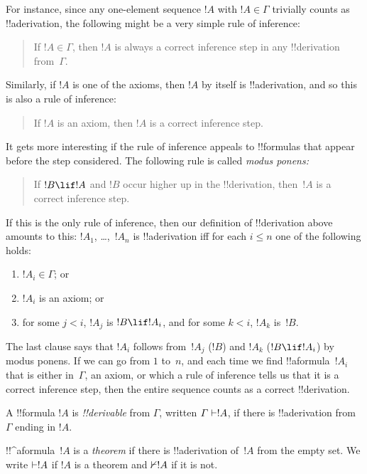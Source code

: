 \documentclass[../../../include/open-logic-section]{subfiles}
\begin{document}
For instance, since any one-element sequence $!A$ with $!A \in \Gamma$
trivially counts as !!a{derivation}, the following might be a very
simple rule of inference:
\begin{quote}
  If $!A \in \Gamma$, then $!A$ is always a correct inference step in
  any !!{derivation} from~$\Gamma$.
\end{quote}
Similarly, if $!A$ is one of the axioms, then $!A$ by itself is
!!a{derivation}, and so this is also a rule of inference:
\begin{quote}
  If $!A$ is an axiom, then $!A$ is a correct inference step.
\end{quote}
It gets more interesting if the rule of inference appeals to
!!{formula}s that appear before the step considered. The following
rule is called \emph{modus ponens:}
\begin{quote}
  If $!B \lif !A$ and $!B$ occur higher up in the !!{derivation},
  then~$!A$ is a correct inference step.
\end{quote}
If this is the only rule of inference, then our definition of
!!{derivation} above amounts to this: $!A_1$, \dots,~$!A_n$ is
!!a{derivation} iff for each $i \le n$ one of the following holds:
\begin{enumerate}
\item $!A_i \in \Gamma$; or
\item $!A_i$ is an axiom; or
\item for some $j < i$, $!A_j$ is $!B \lif !A_i$, and for some $k < i$,
  $!A_k$ is~$!B$.
\end{enumerate}
The last clause says that $!A_i$ follows from~$!A_j$ ($!B$) and $!A_k$
($!B \lif !A_i$) by modus ponens. If we can go from $1$ to~$n$, and
each time we find !!a{formula}~$!A_i$ that is either in~$\Gamma$, an
axiom, or which a rule of inference tells us that it is a correct
inference step, then the entire sequence counts as a correct
!!{derivation}.

\begin{defn}[!!^{derivability}]
A !!{formula} $!A$ is \emph{!!{derivable}} from $\Gamma$, written
$\Gamma \Proves !A$, if there is !!a{derivation} from $\Gamma$ ending
in $!A$.
\end{defn}

\begin{defn}[Theorems]
!!^a{formula}~$!A$ is a \emph{theorem} if there is !!a{derivation}
of~$!A$ from the empty set.  We write $\Proves !A$ if $!A$ is a
theorem and $\Proves/ !A$ if it is not.
\end{defn}
\end{document}
